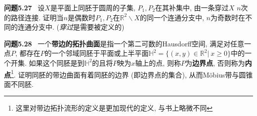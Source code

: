 \documentclass[11pt]{article}
\theoremstyle{definition}\newtheorem*{analyse}{分析}
\newenvironment{env}[1]{\par\vspace{1em}\noindent\textbf{#1}\ }{\par\vspace{1em}}
\begin{document}
\begin{env}{问题5.27}
    设$X$是平面上同胚于圆周的子集, $P_1,P_2$在其补集中, 由一条穿过$X$ $n$次的路径连接.
    证明当$n$是偶数时$P_1,P_2$在$\mathbb{R}^2\backslash X$的同一个连通分支中, $n$为奇数时在不同的连通分支中.
    (\textit{穿过}是需要被定义的)
\end{env}

\begin{env}{问题5.28}
    一个\textbf{带边的拓扑曲面}是指一个第二可数的Hausdorff空间, 满足对任意一点$P$, 都存在$P$的一个邻域同胚于平面或上半平面$\mathbb{H}^2=\{(x,y)\in\mathbb{R}^2|\ x\geq 0\}$中的一个开集.
    如果这个同胚是到$\mathbb{H}^2$的且将$P$映为$x$轴上的点, 则称$P$为\textbf{边界点}, 否则称为\textbf{内点}\footnote{这里对带边拓扑流形的定义是更加现代的定义, 与书上略微不同}.
    证明同胚的带边曲面有着同胚的边界 (即边界点的集合), 从而M\"{o}bius带与圆锥面不同胚.
\end{env}

\printbibliography[title={参考文献}]
\end{document}

